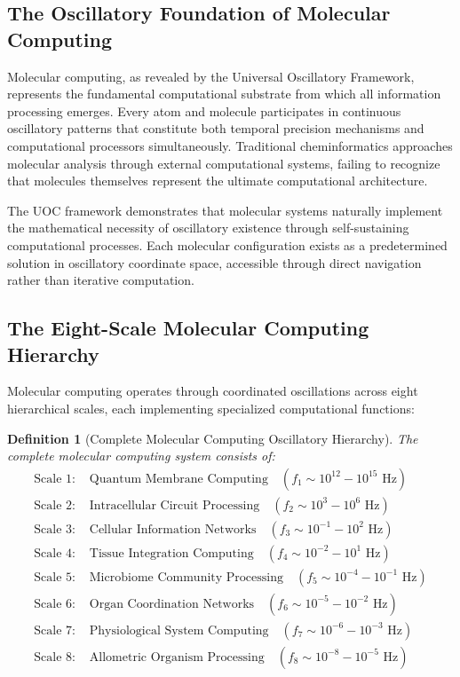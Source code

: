 \documentclass[12pt,a4paper]{article}
\newtheorem{definition}[theorem]{Definition}
\begin{document}
\subsection{The Oscillatory Foundation of Molecular Computing}

Molecular computing, as revealed by the Universal Oscillatory Framework, represents the fundamental computational substrate from which all information processing emerges. Every atom and molecule participates in continuous oscillatory patterns that constitute both temporal precision mechanisms and computational processors simultaneously. Traditional cheminformatics approaches molecular analysis through external computational systems, failing to recognize that molecules themselves represent the ultimate computational architecture.

The UOC framework demonstrates that molecular systems naturally implement the mathematical necessity of oscillatory existence through self-sustaining computational processes. Each molecular configuration exists as a predetermined solution in oscillatory coordinate space, accessible through direct navigation rather than iterative computation.

\subsection{The Eight-Scale Molecular Computing Hierarchy}

Molecular computing operates through coordinated oscillations across eight hierarchical scales, each implementing specialized computational functions:

\begin{definition}[Complete Molecular Computing Oscillatory Hierarchy]
The complete molecular computing system consists of:
\begin{align}
\text{Scale 1: } &\text{Quantum Membrane Computing} \quad (f_1 \sim 10^{12}-10^{15} \text{ Hz}) \label{eq:quantum_membrane_comp} \\
\text{Scale 2: } &\text{Intracellular Circuit Processing} \quad (f_2 \sim 10^3-10^6 \text{ Hz}) \label{eq:intracellular_comp} \\
\text{Scale 3: } &\text{Cellular Information Networks} \quad (f_3 \sim 10^{-1}-10^2 \text{ Hz}) \label{eq:cellular_comp} \\
\text{Scale 4: } &\text{Tissue Integration Computing} \quad (f_4 \sim 10^{-2}-10^1 \text{ Hz}) \label{eq:tissue_comp} \\
\text{Scale 5: } &\text{Microbiome Community Processing} \quad (f_5 \sim 10^{-4}-10^{-1} \text{ Hz}) \label{eq:microbiome_comp} \\
\text{Scale 6: } &\text{Organ Coordination Networks} \quad (f_6 \sim 10^{-5}-10^{-2} \text{ Hz}) \label{eq:organ_comp} \\
\text{Scale 7: } &\text{Physiological System Computing} \quad (f_7 \sim 10^{-6}-10^{-3} \text{ Hz}) \label{eq:physiological_comp} \\
\text{Scale 8: } &\text{Allometric Organism Processing} \quad (f_8 \sim 10^{-8}-10^{-5} \text{ Hz}) \label{eq:allometric_comp}
\end{align}
\end{definition}
\end{document}
